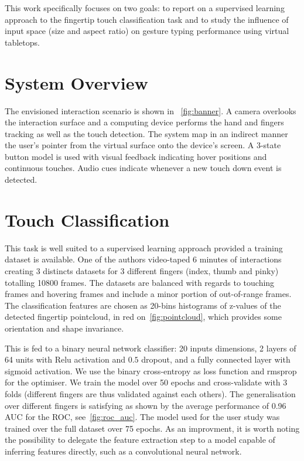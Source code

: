 \documentclass{chi-ext}
\begin{document}
This work specifically focuses on two goals: to report on a supervised learning approach to the fingertip touch classification task and to study the influence of input space (size and aspect ratio) on gesture typing performance using virtual tabletops.

\section{System Overview}
The envisioned interaction scenario is shown in ~\autoref{fig:banner}. A camera overlooks the interaction surface and a computing device performs the hand and fingers tracking as well as the touch detection. The system map in an indirect manner the user's pointer from the virtual surface onto the device's screen. A 3-state button model is used with visual feedback indicating hover positions and continuous touches. Audio cues indicate whenever a new touch down event is detected.

\section{Touch Classification}
This task is well suited to a supervised learning approach provided a training dataset is available. One of the authors video-taped 6 minutes of interactions creating 3 distincts datasets for 3 different fingers (index, thumb and pinky) totalling 10800 frames. The datasets are balanced with regards to touching frames and hovering frames and include a minor portion of out-of-range frames. The classification features are chosen as 20-bins histograms of z-values of the detected fingertip pointcloud, in red on~\autoref{fig:pointcloud}, which provides some orientation and shape invariance.

This is fed to a binary neural network classifier: 20 inputs dimensions, 2 layers of 64 units with Relu activation and $0.5$ dropout, and a fully connected layer with sigmoid activation. We use the binary cross-entropy as loss function and rmsprop for the optimiser. We train the model over 50 epochs and cross-validate with 3 folds (different fingers are thus validated against each others). The generalisation over different fingers is satisfying as shown by the average performance of 0.96 AUC for the ROC, see~\autoref{fig:roc_auc}. The model used for the user study was trained over the full dataset over 75 epochs. As an improvment, it is worth noting the possibility to delegate the feature extraction step to a model capable of inferring features directly, such as a convolutional neural network.
\end{document}
